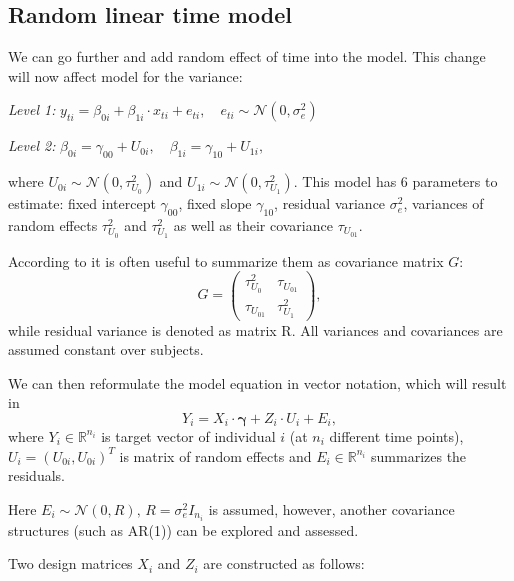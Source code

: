 \documentclass[
  12pt,
]{article}
\begin{document}
\subsection{Random linear time model}\label{random-linear-time-model}

We can go further and add random effect of time into the model. This
change will now affect model for the variance:

\emph{Level 1:}
\(y_{ti} = \beta_{0i} + \beta_{1i} \cdot x_{ti}+ e_{ti}, \quad e_{ti} \sim \mathcal{N}(0, \sigma_e^2)\)

\emph{Level 2:}
\(\beta_{0i} = \gamma_{00} + U_{0i}, \quad \beta_{1i} =  \gamma_{10} + U_{1i},\)

where \(U_{0i} \sim \mathcal{N}(0, \tau_{U_0}^2)\) and
\(U_{1i} \sim \mathcal{N}(0, \tau_{U_1}^2)\). This model has 6
parameters to estimate: fixed intercept \(\gamma_{00}\), fixed slope
\(\gamma_{10}\), residual variance \(\sigma_e^2\), variances of random
effects \(\tau_{U_0}^2\) and \(\tau_{U_1}^2\) as well as their
covariance \(\tau_{U_{01}}\).

According to \autocite{hoffman_2015} it is often useful to summarize
them as covariance matrix \(G\): \[G =  \begin{pmatrix}
                    \tau_{U_0}^2 & \tau_{U_{01}} \\ 
                    \tau_{U_{01}} & \tau_{U_1}^2
        \end{pmatrix},\] while residual variance is denoted as matrix R.
All variances and covariances are assumed constant over subjects.

We can then reformulate the model equation in vector notation, which
will result in \[
Y_i = X_i \cdot \mathbf{\gamma} + Z_i \cdot U_i + E_i,
\] where \(Y_i \in \mathbb{R}^{n_i}\) is target vector of individual
\(i\) (at \(n_i\) different time points), \(U_i = (U_{0i}, U_{0i})^T\)
is matrix of random effects and \(E_i\in \mathbb{R}^{n_i}\) summarizes
the residuals.

Here \(E_{i} \sim \mathcal{N}(0, R), \, R = \sigma_e^2 I_{n_i}\) is
assumed, however, another covariance structures (such as AR(1)) can be
explored and assessed.

Two design matrices \(X_i\) and \(Z_i\) are constructed as follows:
\end{document}
